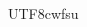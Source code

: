 \documentclass[12pt,a4paper]{book}
\begin{document}
\begin{CJK}{UTF8}{cybercjk} 

\renewcommand{\contentsname}{目錄}
\renewcommand{\tablename}{表}
\renewcommand{\figurename}{圖}
\renewcommand{\listtablename}{表格目錄}
\renewcommand{\listfigurename}{圖目錄}
\renewcommand{\chaptermark}[1]{\markboth{第\ \thechapter\ 章\ #1}{}}
\renewcommand{\sectionmark}[1]%

\frontmatter
\tableofcontents
\listoftables
\listoffigures


\mainmatter

%
\end{CJK}{UTF8}{cwfsu} 
\end{document}
